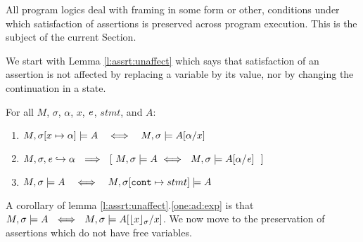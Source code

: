 


All program logics deal with framing in some form or other, \ie conditions under which  satisfaction of  assertions is preserved across program execution. 
This is the subject of the current Section.

We start with  Lemma \ref{l:assrt:unaffect}  which says that satisfaction of an assertion is not affected by replacing a variable by its value, nor by changing the continuation in a state.


\begin{lemma}
\label{lemma:addr:expr}
\label{l:assrt:unaffect}
For all $M$, $\sigma$, $\alpha$, $x$, $\mathit{e}$, $stmt$, and $A$:

\begin{enumerate}
\item
\label{one:ad:exp}
$ \satisfiesA{M}{\sigma[x\mapsto \alpha]}{A}   \ \ \ \Longleftrightarrow\ \ \ \satisfiesA{M}{\sigma}{A[\alpha/x]} $ 
\item
$\eval{M}{\sigma}{{\re}}{\alpha}  \ \ \Longrightarrow\ \  [ \ \satisfiesA{M}{\sigma}{A} \  \Longleftrightarrow\   \  \satisfiesA{M}{\sigma}{A[\alpha/\re]} \  \  ]$
\item
$ \satisfiesA{M}{\sigma}{A}   \ \ \ \Longleftrightarrow\ \ \ \satisfiesA{M}{\sigma[\prg{cont}\mapsto stmt]}{A}$ 
\end{enumerate}

\end{lemma}

A corollary of   lemma \ref{l:assrt:unaffect}.\ref{one:ad:exp} is that $\satisfiesA{M}{\sigma}{A}  \ \ \Longleftrightarrow  \ \   \satisfiesA{M}{\sigma}{A[{\interpret \sigma x}/x]}$.
We now move to the preservation of assertions which do not have free variables.

